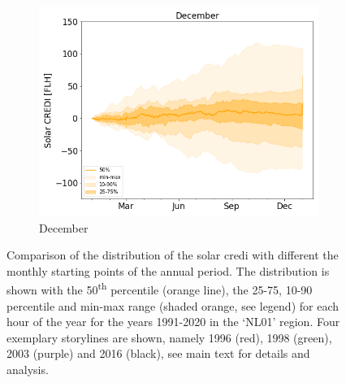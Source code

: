 \documentclass[a4paper,11pt]{extarticle}
\newcommand{\ts}[1]{\textsuperscript{#1}}
\newcommand{\sdi}[0]{{\sc solar credi}}
\begin{document}
\begin{figure}[t]
\begin{subfigure}[t]{0.32\linewidth}
    \includegraphics[width=\linewidth]{Fig_CUMSUM_YearStart_SPV_December}
    \caption{December }
\end{subfigure}
\caption{
    Comparison of the distribution of the \sdi{} with different the monthly starting points of the annual period. 
    The distribution is shown with the 50\ts{th} percentile (orange line), the 25-75, 10-90 percentile and min-max range (shaded orange, see legend) for each hour of the year for the years 1991-2020 in the `NL01' region. 
    Four exemplary storylines are shown, namely 1996 (red), 1998 (green), 2003 (purple) and 2016 (black), see main text for details and analysis.}
\label{SIfig:startdate_solar}
\end{figure}
\end{document}
